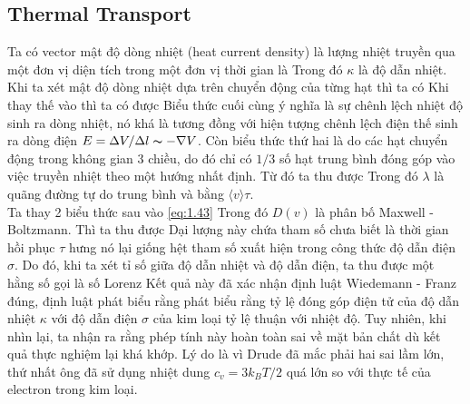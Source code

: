 \subsection{Thermal Transport}
Ta có vector mật độ dòng nhiệt (heat current density) là lượng nhiệt truyền qua một đơn vị diện tích trong một đơn vị thời gian là
Trong đó $\kappa$ là độ dẫn nhiệt. Khi ta xét mật độ dòng nhiệt dựa trên chuyển động của từng hạt thì ta có
Khi thay thế vào thì ta có được
Biểu thức cuối cùng ý nghĩa là sự chênh lệch nhiệt độ sinh ra dòng nhiệt, nó khá là tương đồng với hiện tượng chênh lệch điện thế sinh ra dòng điện $E = \Delta V/\Delta l \thicksim  - \nabla V$. Còn biểu thức thứ hai là do các hạt chuyển động trong không gian 3 chiều, do đó chỉ có $1/3$ số hạt trung bình đóng góp vào việc truyền nhiệt theo một hướng nhất định. Từ đó ta thu được
Trong đó $\lambda$ là quãng đường tự do trung bình và bằng $\langle v \rangle \tau$.\\
\indent Ta thay 2 biểu thức sau vào \eqref{eq:1.43}
Trong đó $D(v)$ là phân bố Maxwell - Boltzmann. Thì ta thu được 
Dại lượng này chứa tham số chưa biết là thời gian hồi phục $\tau$ hưng nó lại giống hệt tham số xuất hiện trong công thức độ dẫn điện $\sigma$. Do đó, khi ta xét tỉ số giữa độ dẫn nhiệt và độ dẫn điện, ta thu được một hằng số gọi là số Lorenz
Kết quả này đã xác nhận định luật Wiedemann - Franz đúng, định luật phát biểu rằng phát biểu rằng tỷ lệ đóng góp điện tử của độ dẫn nhiệt $\kappa$ với độ dẫn điện $\sigma$ của kim loại tỷ lệ thuận với nhiệt độ. 
Tuy nhiên, khi nhìn lại, ta nhận ra rằng phép tính này hoàn toàn sai về mặt bản chất dù kết quả thực nghiệm lại khá khớp. Lý do là vì Drude đã mắc phải hai sai lầm lớn, thứ nhất ông đã sử dụng nhiệt dung $c_v =3k_BT/2$ quá lớn so với thực tế của electron trong kim loại.
